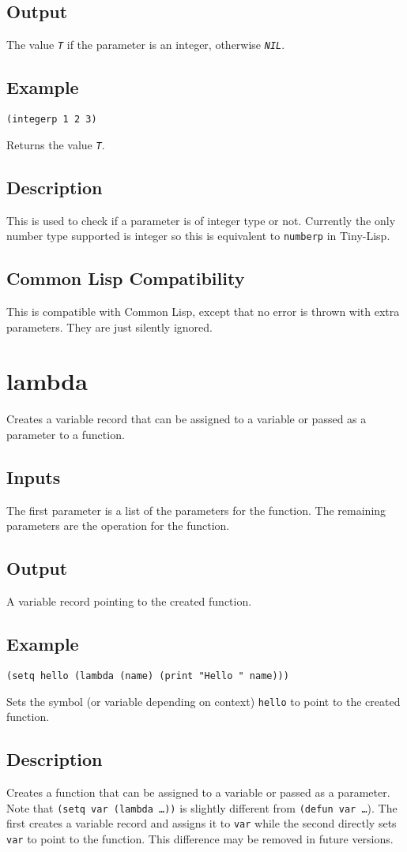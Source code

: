 \documentclass[10pt, openany]{book}
\newcommand{\constant}[1]{\emph{\texttt{#1}}}
\newcommand{\keyword}[1]{\texttt{#1}}
\newcommand{\tl}{Tiny-Lisp}
\newcommand{\cl}{Common Lisp}
\begin{document}
\subsection{Output}
The value \constant{T} if the parameter is an integer, otherwise \constant{NIL}.
\subsection{Example}
\begin{lstlisting}
(integerp 1 2 3)
\end{lstlisting}
Returns the value \constant{T}.
\subsection{Description}
This is used to check if a parameter is of integer type or not.  Currently the only number type supported is integer so this is equivalent to \keyword{numberp} in \tl.
\subsection{Common Lisp Compatibility}
This is compatible with \cl, except that no error is thrown with extra parameters.  They are just silently ignored.

\section{lambda}
Creates a variable record that can be assigned to a variable or passed as a parameter to a function.
\subsection{Inputs}
The first parameter is a list of the parameters for the function.  The remaining parameters are the operation for the function.
\subsection{Output}
A variable record pointing to the created function.
\subsection{Example}
\begin{lstlisting}
(setq hello (lambda (name) (print "Hello " name)))
\end{lstlisting}
Sets the symbol (or variable depending on context) \keyword{hello} to point to the created function.
\subsection{Description}
Creates a function that can be assigned to a variable or passed as a parameter.  Note that \keyword{(setq var (lambda \dots))} is slightly different from \keyword{(defun var \dots}).  The first creates a variable record and assigns it to \keyword{var} while the second directly sets \keyword{var} to point to the function.  This difference may be removed in future versions.
\end{document}
